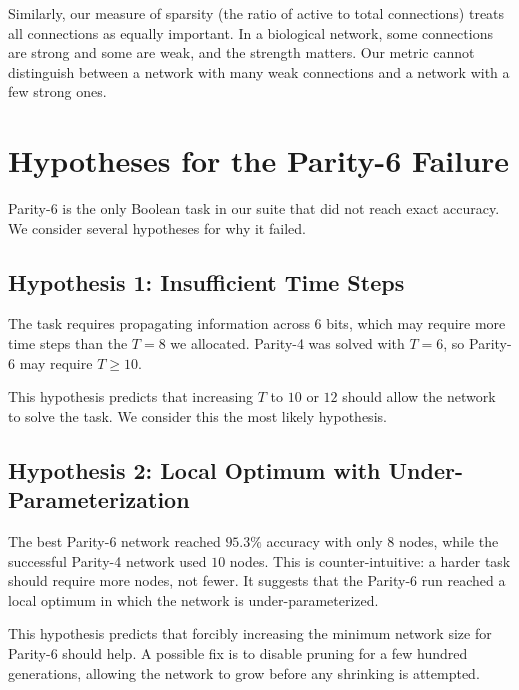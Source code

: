 Similarly, our measure of sparsity (the ratio of active to total
connections) treats all connections as equally important. In a
biological network, some connections are strong and some are weak, and
the strength matters. Our metric cannot distinguish between a network
with many weak connections and a network with a few strong ones.

\section{Hypotheses for the Parity-6 Failure}
\label{sec:disc-parity6-hypotheses}

Parity-6 is the only Boolean task in our suite that did not reach exact
accuracy. We consider several hypotheses for why it failed.

\subsection{Hypothesis 1: Insufficient Time Steps}
\label{sec:disc-h1}

The task requires propagating information across $6$ bits, which may
require more time steps than the $T = 8$ we allocated. Parity-4 was
solved with $T = 6$, so Parity-6 may require $T \geq 10$.

This hypothesis predicts that increasing $T$ to $10$ or $12$ should
allow the network to solve the task. We consider this the most likely
hypothesis.

\subsection{Hypothesis 2: Local Optimum with Under-Parameterization}
\label{sec:disc-h2}

The best Parity-6 network reached $95.3\%$ accuracy with only $8$ nodes,
while the successful Parity-4 network used $10$ nodes. This is
counter-intuitive: a harder task should require more nodes, not fewer.
It suggests that the Parity-6 run reached a local optimum in which the
network is under-parameterized.

This hypothesis predicts that forcibly increasing the minimum network
size for Parity-6 should help. A possible fix is to disable pruning for
a few hundred generations, allowing the network to grow before any
shrinking is attempted.

